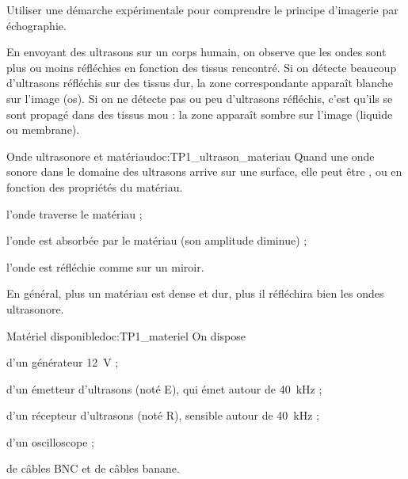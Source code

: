 \teteTermStssImag
{}


\begin{objectifs}
  \item Utiliser une démarche expérimentale pour comprendre le principe d'imagerie par échographie.
\end{objectifs}

\begin{contexte}
  En envoyant des ultrasons sur un corps humain, on observe que les ondes sont plus ou moins réfléchies en fonction des tissus rencontré.
  Si on détecte beaucoup d'ultrasons réfléchis sur des tissus dur, la zone correspondante apparaît blanche sur l’image (os).
  Si on ne détecte pas ou peu d’ultrasons réfléchis, c’est qu’ils se sont propagé dans des tissus mou : la zone apparaît sombre sur l’image (liquide ou membrane).
  
\end{contexte}


\begin{doc}{Onde ultrasonore et matériau}{doc:TP1_ultrason_materiau}
  Quand une onde sonore dans le domaine des ultrasons arrive sur une surface,
  elle peut être ,  ou  en fonction des propriétés du matériau.
  \begin{listePoints}
    \item {} l'onde traverse le matériau ;
    \item {} l'onde est absorbée par le matériau (son amplitude diminue) ;
    \item {} l'onde est réfléchie comme sur un miroir.
  \end{listePoints}

  En général, plus un matériau est dense et dur, plus il réfléchira bien les ondes ultrasonore.
\end{doc}

\begin{doc}{Matériel disponible}{doc:TP1_materiel}
  On dispose 
  \begin{listeTirets}
    \item d'un générateur \qty{12}{\volt} ;
    \item d'un émetteur d'ultrasons (noté E), qui émet autour de \qty{40}{\kilo\hertz} ;
    \item d'un récepteur d'ultrasons (noté R), sensible autour de \qty{40}{\kilo\hertz} ;
    \item d'un oscilloscope ;
    \item de câbles BNC et de câbles banane.
  \end{listeTirets}
\end{doc}

